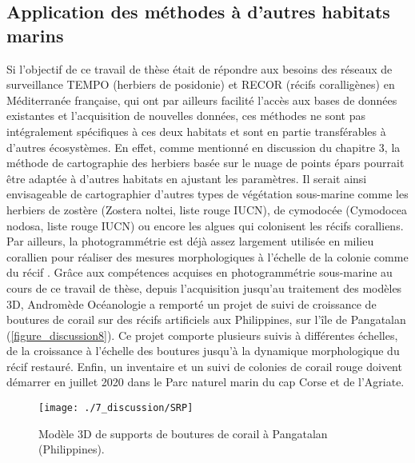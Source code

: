 \subsection{Application des méthodes à d’autres habitats marins}

Si l’objectif de ce travail de thèse était de répondre aux besoins des réseaux de surveillance TEMPO (herbiers de posidonie) et RECOR (récifs coralligènes) en Méditerranée française, qui ont par ailleurs facilité l’accès aux bases de données existantes et l’acquisition de nouvelles données, ces méthodes ne sont pas intégralement spécifiques à ces deux habitats et sont en partie transférables à d’autres écosystèmes. En effet, comme mentionné en discussion du chapitre 3, la méthode de cartographie des herbiers basée sur le nuage de points épars pourrait être adaptée à d’autres habitats en ajustant les paramètres. Il serait ainsi envisageable de cartographier d’autres types de végétation sous-marine comme les herbiers de zostère (Zostera noltei, liste rouge IUCN), de cymodocée (Cymodocea nodosa, liste rouge IUCN) ou encore les algues qui colonisent les récifs coralliens. Par ailleurs, la photogrammétrie est déjà assez largement utilisée en milieu corallien pour réaliser des mesures morphologiques à l’échelle de la colonie \citep{courtney_estimating_2007, agudo-adriani_colony_2016, zawada_quantifying_2019} comme du récif \citep{leon_measuring_2015, burns_assessing_2016, bryson_characterization_2017, pizarro_simple_2017, anelli_towards_2019}. Grâce aux compétences acquises en photogrammétrie sous-marine au cours de ce travail de thèse, depuis l’acquisition jusqu’au traitement des modèles 3D, Andromède Océanologie a remporté un projet de suivi de croissance de boutures de corail sur des récifs artificiels aux Philippines, sur l’île de Pangatalan (\autoref{figure_discussion8}). Ce projet comporte plusieurs suivis à différentes échelles, de la croissance à l’échelle des boutures jusqu’à la dynamique morphologique du récif restauré. Enfin, un inventaire et un suivi de colonies de corail rouge doivent démarrer en juillet 2020 dans le Parc naturel marin du cap Corse et de l’Agriate.

\begin{figure}[H]
	\begin{center}
	\texttt{[image: ./7\_discussion/SRP]}
		\caption{Modèle 3D de supports de boutures de corail à Pangatalan (Philippines).}
	\label{figure_discussion8}
\end{center}
\end{figure}

